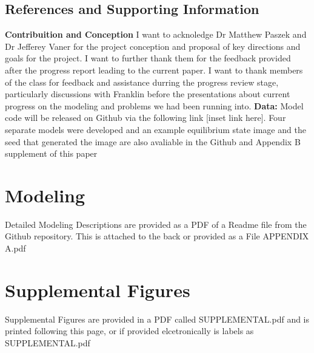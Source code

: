 \documentclass[12pt]{ifacconf}
\begin{document}
\subsection{References and Supporting Information}


\begin{ack}

\textbf{Contribuition and Conception} I want to acknoledge Dr Matthew Paszek and Dr Jefferey Vaner for the project conception and proposal of key directions and goals for the project. I want to further thank them for the feedback provided after the progress report leading to the current paper. I want to thank members of the class for feedback and assistance durring the progress review stage, particularly discussions with Franklin before the presentations about current progress on the modeling and problems we had been running into. \textbf{Data:} Model code will be released on Github via the following link [inset link here]. Four separate models were developed and an example equilibrium state image and the seed that generated the image are also avaliable in the Github and Appendix B supplement of this paper

\end{ack}






\appendix
\section{Modeling}    %

Detailed Modeling Descriptions are provided as a PDF of a Readme file from the Github repository. This is attached to the back or provided as a File APPENDIX A.pdf
\section{Supplemental Figures }              %

Supplemental Figures are provided in a PDF called SUPPLEMENTAL.pdf and is printed following this page, or if provided elcetronically is labels as SUPPLEMENTAL.pdf
\end{document}
